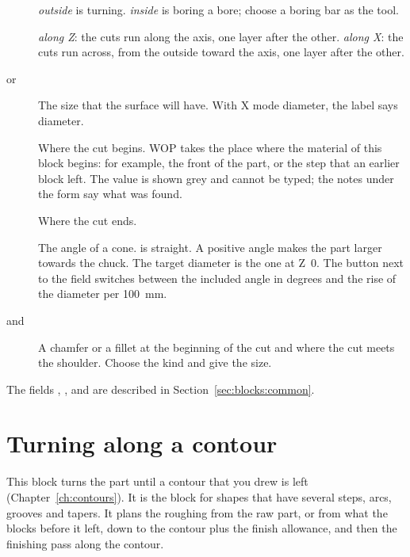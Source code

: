 \begin{description}
\item[] \emph{outside} is turning. \emph{inside} is boring a bore; choose a boring bar as the tool.
\item[] \emph{along Z}: the cuts run along the axis, one layer after the other. \emph{along X}: the cuts run across, from the outside toward the axis, one layer after the other.
\item[ or ] The size that the surface will have. With X mode diameter, the label says diameter.
\item[] Where the cut begins. WOP takes the place where the material of this block begins: for example, the front of the part, or the step that an earlier block left. The value is shown grey and cannot be typed; the notes under the form say what was found.
\item[] Where the cut ends.
\item[] The angle of a cone.  is straight. A positive angle makes the part larger towards the chuck. The target diameter is the one at Z~0. The button next to the field switches between the included angle in degrees and the rise of the diameter per 100~mm.
\item[ and ] A chamfer or a fillet at the beginning of the cut and where the cut meets the shoulder. Choose the kind and give the size.
\end{description}

The fields , ,  and  are described in Section~\ref{sec:blocks:common}.

\section{Turning along a contour}\label{sec:blocks:contour}


This block turns the part until a contour that you drew is left (Chapter~\ref{ch:contours}). It is the block for shapes that have several steps, arcs, grooves and tapers. It plans the roughing from the raw part, or from what the blocks before it left, down to the contour plus the finish allowance, and then the finishing pass along the contour.

